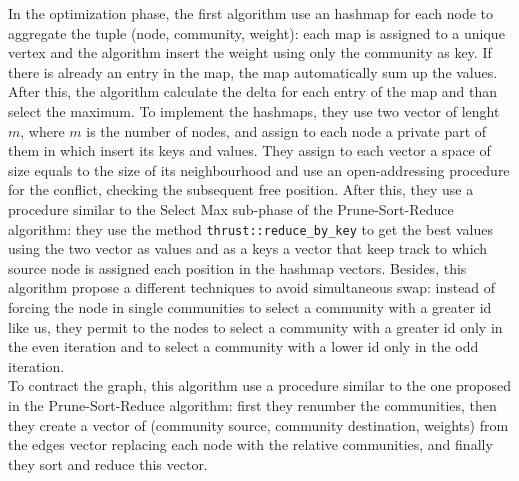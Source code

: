 In the optimization phase, the first algorithm use an hashmap for each node to aggregate the tuple (node, community, weight): each map is assigned to a unique vertex and the algorithm insert the weight using only the 
community as key. If there is already an entry in the map, the map automatically sum up the values. After this, the algorithm calculate the delta for each entry of the map and than select the maximum. To implement the hashmaps, they use two vector of lenght $m$, where $m$ is the number of nodes, and assign to each node a private part of them in which insert its keys and values. They assign to each vector a space of size equals to the size of its neighbourhood and use an open-addressing procedure for the conflict, checking the subsequent free position. 
After this, they use a procedure similar to the Select Max sub-phase of the Prune-Sort-Reduce algorithm: 
they use the method \verb|thrust::reduce_by_key| to get the best values using the two vector as values and as a keys a vector that keep track to which source node is assigned each position in the hashmap vectors. Besides, this algorithm propose a different techniques to avoid simultaneous swap: instead of forcing the node in single communities to select a community with a greater id like us, they permit to the nodes to select a community with a greater id only in the even iteration and to select a community with a lower id only in the odd iteration. \\
To contract the graph, this algorithm use a procedure similar to the one proposed in the Prune-Sort-Reduce algorithm: first they renumber the communities, then they create a vector of (community source, community destination, weights) from the edges vector replacing each node with the relative communities, and finally they sort and reduce this vector.


